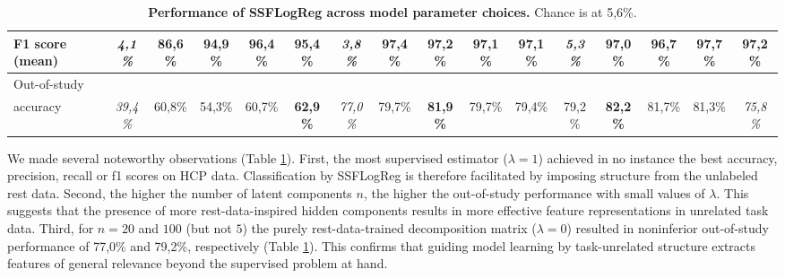 \documentclass{article} %
\begin{document}
\begin{table}[h]
{\begin{tabular}{l|ccccc|ccccc|ccccc}
  F1 score (mean)           & \textit{4,1\%}                     & 86,6\%                             & 94,9\%                            & \textbf{96,4\%}                    & 95,4\%                           & \textit{3,8\%}                   & \textbf{97,4\%}                      & 97,2\%                              & 97,1\%                               & 97,1\%                             & \textit{5,3\%}   & 97,0\%           & 96,7\%           & \textbf{97,7\%}  & 97,2\%                             \\ \hline
  Out-of-study\\accuracy    & \textit{39,4\%}                    & 60,8\%                             & 54,3\%                            & 60,7\%                             & \textbf{62,9\%}                  & \textit{77,0\%}                  & 79,7\%                               & \textbf{81,9\%}                     & 79,7\%                               & 79,4\%                             & 79,2\%           & \textbf{82,2\%}  & 81,7\%           & 81,3\%           & \textit{75,8\%}                    \\ \hline
  \end{tabular}
}
\vspace{-0.2cm}
 \caption{\textbf{Performance of SSFLogReg across model parameter choices.}
 Chance is at 5,6\%.
 }
  \label{table_two}
\end{table}

We made several noteworthy observations (Table \ref{table_two}).
%
First, the most supervised estimator ($\lambda=1$) achieved in no
instance the best accuracy, precision, recall or f1 scores on HCP data.
Classification by SSFLogReg is therefore facilitated by
imposing structure from the unlabeled rest data.
%
Second, the higher the number of latent components $n$,
the higher the out-of-study performance with small values of $\lambda$.
This suggests that the presence of more rest-data-inspired hidden components
results in more effective feature representations in unrelated task data.
%
Third, for $n=20$ and $100$ (but not $5$) the purely rest-data-trained
decomposition matrix ($\lambda=0$) resulted in
noninferior out-of-study performance
of 77,0\% and 79,2\%,
respectively (Table \ref{table_two}).
This confirms that guiding model learning by task-unrelated structure
extracts features of general relevance
beyond the supervised problem at hand.

\end{document}
